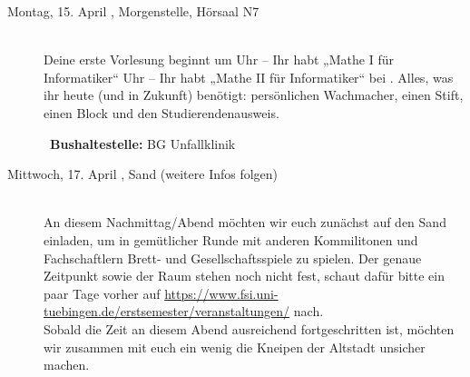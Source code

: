 \begin{description}
\ifbachelor
\item[Montag, 15. April \YEAR, Morgenstelle, Hörsaal N7]\ \\
Deine erste Vorlesung beginnt um
 Uhr -- Ihr habt „Mathe I für Informatiker“  \fi
{} Uhr -- Ihr habt „Mathe II für Informatiker“  \fi
bei \Matheprof.
Alles, was ihr heute (und in Zukunft) benötigt: persönlichen Wachmacher, einen Stift, einen Block und den Studierendenausweis.

~\textbf{Bushaltestelle:} BG Unfallklinik
\fi



%
%


\item[Mittwoch, 17. April \YEAR,  Sand (weitere Infos folgen)]\ \\
An diesem Nachmittag/Abend möchten wir euch zunächst auf den Sand einladen, um in gemütlicher Runde mit anderen Kommilitonen und Fachschaftlern Brett- und Gesellschaftsspiele zu spielen. Der genaue Zeitpunkt sowie der Raum stehen noch nicht fest, schaut dafür bitte ein paar Tage vorher auf \url{https://www.fsi.uni-tuebingen.de/erstsemester/veranstaltungen/} nach.\\ Sobald die Zeit an diesem Abend ausreichend fortgeschritten ist, möchten wir zusammen mit euch ein wenig die Kneipen der Altstadt unsicher machen. 


\end{description}
